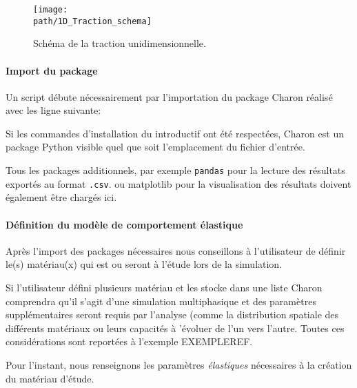 \documentclass[10pt]{book}
\def\path{./fig}
\begin{document}
\begin{figure}[h!]
\centering \texttt{[image: \\path/1D\_Traction\_schema]}
\caption{Schéma de la traction unidimensionnelle.}
\label{fig:traction_1D_schema}
\end{figure}

\paragraph{Import du package} Un script débute nécessairement par l'importation du package Charon réalisé avec les ligne suivante:

\begin{figure}[h!]

\end{figure}

Si les commandes d'installation du  introductif ont été respectées, Charon est un package Python visible quel que soit l'emplacement du fichier d'entrée.

Tous les packages additionnels, par exemple \texttt{pandas} pour la lecture des résultats exportés au format \texttt{.csv}. ou matplotlib pour la visualisation des résultats doivent également être chargés ici.
\paragraph{Définition du modèle de comportement élastique} Après l'import des packages nécessaires nous conseillons à l'utilisateur de définir le(s) matériau(x) qui est ou seront à l'étude lors de la simulation. 

Si l'utilisateur défini plusieurs matériau et les stocke dans une liste Charon comprendra qu'il s'agit d'une simulation multiphasique et des paramètres supplémentaires seront requis par l'analyse (comme la distribution spatiale des différents matériaux ou leurs capacités à 'évoluer de l'un vers l'autre. Toutes ces considérations sont reportées à l'exemple EXEMPLEREF.

Pour l'instant, nous renseignons les paramètres \emph{élastiques} nécessaires à la création du matériau d'étude.
\end{document}
